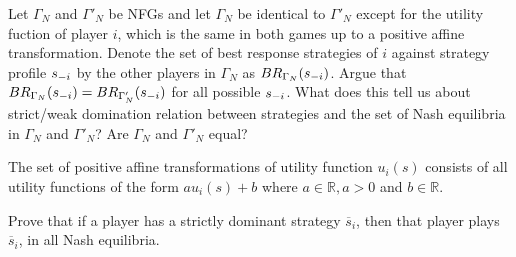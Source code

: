 \documentclass[../main.tex]{subfiles}
\begin{document}
\begin{solution}

\end{solution}

\begin{question}
Let $\Gamma_N$ and $\Gamma'_N$ be NFGs and let $\Gamma_N$  be identical to $\Gamma'_N$ except for the utility fuction of player $i$, which is the same in both games up to a positive affine transformation.
Denote the set of best response strategies of $i$ against strategy profile $s_{\--i}$ by the other players in $\Gamma_N$  as $BR_{\Gamma_N}(s_{\--i})$.
Argue that $BR_{\Gamma_N}(s_{\--i}) = BR_{\Gamma'_N}(s_{\--i})$ for all possible $s_{\--i}$.
What does this tell us about strict/weak domination relation between strategies and the set of Nash equilibria in $\Gamma_N$ and $\Gamma'_N$? Are $\Gamma_N$ and $\Gamma'_N$ equal?

The set of positive affine transformations of utility function $u_i(s)$ consists of all utility functions of the form $au_i(s) + b$ where $a \in \mathbb{R}, a > 0$ and $b \in \mathbb{R}$.
\end{question}

\begin{solution}

\end{solution}

\begin{question}
	Prove that if a player has a strictly dominant strategy $\overline{s}_i$, then that player plays $\overline{s}_i$, in all Nash equilibria. 
\end{question}
\end{document}
